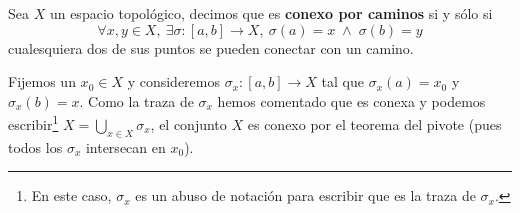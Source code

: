 \begin{defi}
Sea $X$ un espacio topológico, decimos que es \textbf{conexo por caminos} si y sólo si 
\[
\forall x, y \in X,\ \exists \sigma: \left[ a, b \right] \rightarrow X,\ \sigma\left( a \right) = x\; \land \;\sigma\left( b \right) = y
\]
cualesquiera dos de sus puntos se pueden conectar con un camino.
\end{defi}

\begin{obs}
Fijemos un $x_0\in X$ y consideremos $\sigma_x : [a,b]\rightarrow X$ tal que $\sigma_x(a) = x_0$ y $\sigma_x(b) = x$. Como la traza de $\sigma_x$ hemos comentado que es conexa y podemos escribir\footnote{En este caso, $\sigma_x$ es un abuso de notación para escribir que es la traza de $\sigma_x$.} $X = \bigcup_{x\in X} \sigma_x$, el conjunto $X$ es conexo por el teorema del pivote (pues todos los $\sigma_x$ intersecan en $x_0$).
\end{obs}

